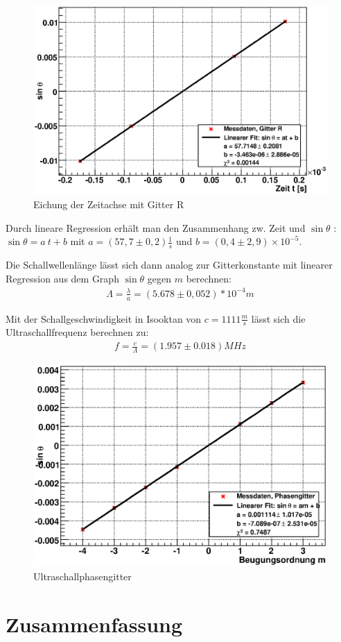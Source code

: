 \documentclass[12pt]{article}
\begin{document}
\begin{figure}[H]  
\centering
\includegraphics[width=0.9\linewidth]{pictures/schall_r.eps}
\caption{Eichung der Zeitachse mit Gitter R}
\end{figure}

Durch lineare Regression erhält man den Zusammenhang zw. Zeit und $\sin\theta$ : $\sin\theta = a~t + b$ mit $a = (57,7 \pm 0,2) \frac{1}{s}$
und $b = (0,4 \pm 2,9)\times 10^{-5}$.

Die Schallwellenlänge lässt sich dann analog zur Gitterkonstante mit linearer Regression aus dem Graph $\sin\theta$ gegen $m$ berechnen:
\begin{align}
 \Lambda = \frac{\lambda}{a} = (5.678 \pm 0,052)*10^{-4} m
\end{align}

Mit der Schallgeschwindigkeit in Isooktan von $c = 1111 \frac{m}{s}$ lässt sich die Ultraschallfrequenz berechnen zu:
\begin{align}
 f = \frac{c}{\Lambda} = (1.957 \pm 0.018) MHz
\end{align}

\begin{figure}[H]  
\centering
\includegraphics[width=0.9\linewidth]{pictures/phasengitter.eps}
\caption{Ultraschallphasengitter}
\end{figure}

\newpage

\section{Zusammenfassung}
\end{document}

